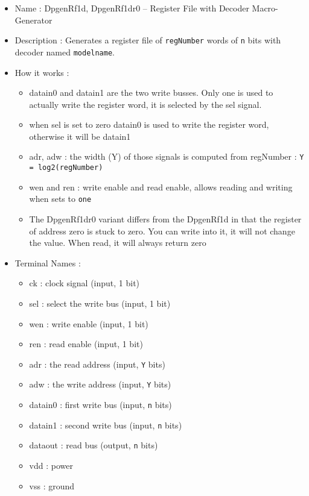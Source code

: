 \begin{itemize}
    \item Name : DpgenRf1d, DpgenRf1dr0 -- Register File with Decoder Macro-Generator
    \item Description : Generates a register file of \verb-regNumber- words of \verb-n- bits with decoder named \verb-modelname-.
    \item How it works :
    \begin{itemize}
        \item datain0 and datain1 are the two write busses. Only one is used to actually write the register word, it is selected by the sel signal.
        \item when sel is set to zero datain0 is used to write the register word, otherwise it will be datain1
        \item adr, adw : the width (Y) of those signals is computed from regNumber : \verb-Y = log2(regNumber)-
        \item wen and ren : write enable and read enable, allows reading and writing when sets to \verb-one-
        \item The DpgenRf1dr0 variant differs from the DpgenRf1d in that the register of address zero is stuck to zero. You can write into it, it will not change the value. When read, it will always return zero
    \end{itemize}
    \item Terminal Names :
    \begin{itemize}
        \item ck : clock signal (input, 1 bit)
        \item sel : select the write bus (input, 1 bit)
        \item wen : write enable (input, 1 bit)
        \item ren : read enable (input, 1 bit)
        \item adr : the read address (input, \verb-Y- bits)
        \item adw : the write address (input, \verb-Y- bits)
        \item datain0 : first write bus (input, \verb-n- bits)
        \item datain1 : second write bus (input, \verb-n- bits)
        \item dataout : read bus (output, \verb-n- bits)
        \item vdd : power
        \item vss : ground
    \end{itemize}

\end{itemize}
